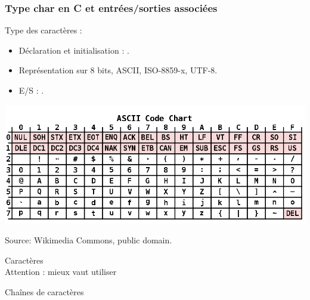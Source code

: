 \documentclass[xcolor=pdftex,svgnames,table]{beamer}
\begin{document}
\begin{frame}
  \frametitle{Type char  en C et entrées/sorties associées}
Type des caractères \alert{} :
    \begin{itemize}
    \item Déclaration et initialisation : .
    \item Représentation sur 8 bits, ASCII, ISO-8859-x, UTF-8.
    \item E/S : \alert{}.
    \end{itemize}

\includegraphics[scale=0.31]{img/1000px-ASCII_Code_Chart.png}

\vspace{-0.3cm}
{\scriptsize\hfill  Source: Wikimedia Commons, public domain.}
\end{frame}


\begin{frame}

  \begin{block}{Caractères}
\\ \pause
    \alert{Attention :} mieux vaut utiliser
  \end{block}\pause

\begin{block}{Chaînes de caractères}
\end{block}
\end{frame}
\end{document}
